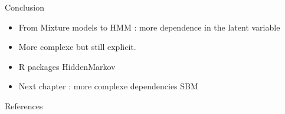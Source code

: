 \documentclass[compress,10pt]{beamer}
\begin{document}
\begin{frame}{Conclusion}
\begin{itemize}
 \item From Mixture models to HMM : more dependence in the latent variable
 \item More complexe but still explicit. 
 \item R packages \textsf{HiddenMarkov}
 \item Next chapter : more complexe dependencies SBM
\end{itemize}

\end{frame}



\begin{frame}{References}

 
\end{frame}
\end{document}
